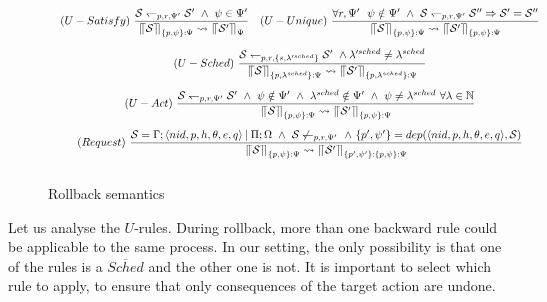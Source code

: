 \documentclass[runningheads]{llncs}
\newcommand{\system}{{\mathcal S}}
\newcommand{\comp}{\:|\:}
\newcommand{\lh}{\leftharpoondown}
\newcommand{\sqll}{\mbox{$\lceil\hspace{-.5ex}\lceil$}}
\newcommand{\sqrr}{\mbox{$\rceil\hspace{-.4ex}\rceil$}}
\let\l=\langle
\let\r=\rangle
\newcommand{\gn}{\rightsquigarrow}
\begin{document}
\begin{figure}[t]
  \small
  \hspace{-1cm}
$
\begin{array}{c}
  \begin{array}{c@{~}c@{~~~}c@{~}c}
  (U-Satisfy) & \displaystyle
  \frac{\mathcal{S}
  \lh_{p,r,\Psi'} 
  \mathcal{S'}~\wedge~ \psi \in \Psi'}
  {\sqll \mathcal{S}\sqrr_{\{p,\psi\}:\Psi} 
  \gn 
  \sqll \mathcal{S'}\sqrr_{\Psi}} &

  (U-Unique) & \displaystyle
  \frac{\forall r,\Psi'~~\psi\notin\Psi'~\wedge~\mathcal{S} 
  \lh_{p,r,\Psi'} 
  \mathcal{S''} \Rightarrow \system' = \system''}
  {\sqll \mathcal{S}\sqrr_{\{p,\psi\}:\Psi} 
  \gn 
  \sqll \mathcal{S'}\sqrr_{\{p,\psi\}:\Psi}}
  \end{array}\\[4ex]
  
  (U-Sched)~\displaystyle
  \frac{\mathcal{S} \lh_{p,r,\{s,\lambda'^{sched}\}} \mathcal{S'}~\wedge\lambda'^{sched} \not= \lambda^{sched}}
  {\sqll \mathcal{S}\sqrr_{ \{p,\lambda^{sched}\}:\Psi} 
  \gn 
  \sqll \mathcal{S'}\sqrr_{\{p,\lambda^{sched}\}:\Psi}}\\[4ex]
    
  (U-Act)~\displaystyle
  \frac{\mathcal{S} 
  \lh_{p,r,\Psi'} 
  \mathcal{S'}~\wedge~ \psi \notin \Psi' ~\wedge ~\lambda^{sched}\notin \Psi'~\wedge ~\psi \not= \lambda^{sched} ~ \forall \lambda \in \mathbb{N}}
  {\sqll \mathcal{S}\sqrr_{\{p,\psi\}:\Psi} 
  \gn 
  \sqll \mathcal{S'}\sqrr_{\{p,\psi\}:\Psi}}\\[4ex]
   
  (Request)~\displaystyle
  \frac{\mathcal{S} =\Gamma;\l nid,p,h,\theta,e,q\r\comp\Pi;\Omega~\wedge~\mathcal{S}
  \not\lh_{p,r,\Psi'}~\wedge~\{p',\psi'\} = dep(\l nid,p,h,\theta,e,q\r,\mathcal{S})}
  {\sqll \mathcal{S}\sqrr_{\{p,\psi\}:\Psi} 
  \gn 
  \sqll \mathcal{S'}\sqrr_{\{p',\psi'\}:\{p,\psi\}:\Psi}}\\[4ex]  

\end{array}
$
\caption{Rollback semantics}
\label{fig:ex-roll-semantics}
\end{figure}





Let us analyse the $U$-rules. 
During rollback, more than one backward rule could be applicable
to the same process. In our setting, the only possibility is that one
of the rules is a $\overline{Sched}$ and the other one is not.
It is important to select which rule to apply, to ensure that only consequences of the target action are undone.
\end{document}
